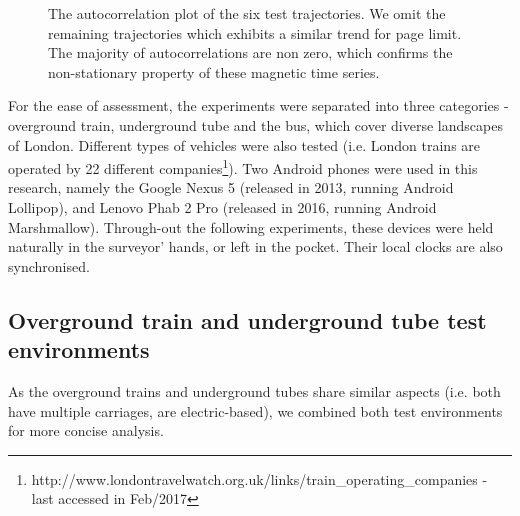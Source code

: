 \documentclass[conference]{IEEEtran}
\begin{document}
\begin{figure*}
	\centering
	
	\hfil
	\hfil
	\hfil
	
	\hfil
	\hfil
	\hfil
	
	\caption{The autocorrelation plot of the six test trajectories. We omit the remaining trajectories which exhibits a similar trend for page limit. The majority of autocorrelations are non zero, which confirms the non-stationary property of these magnetic time series.}
	\label{autocorrelation}
\end{figure*}

For the ease of assessment, the experiments were separated into three categories - overground train, underground tube and the bus, which cover diverse landscapes of London. Different types of vehicles were also tested (i.e. London trains are operated by 22 different companies\footnote{http://www.londontravelwatch.org.uk/links/train\_operating\_companies - last accessed in Feb/2017}). Two Android phones were used in this research, namely the Google Nexus 5 (released in 2013, running Android Lollipop), and Lenovo Phab 2 Pro (released in 2016, running Android Marshmallow). Through-out the following experiments, these devices were held naturally in the surveyor' hands, or left in the pocket. Their local clocks are also synchronised.

\subsection{Overground train and underground tube test environments}
As the overground trains and underground tubes share similar aspects (i.e. both have multiple carriages, are electric-based), we combined both test environments for more concise analysis.
\end{document}
